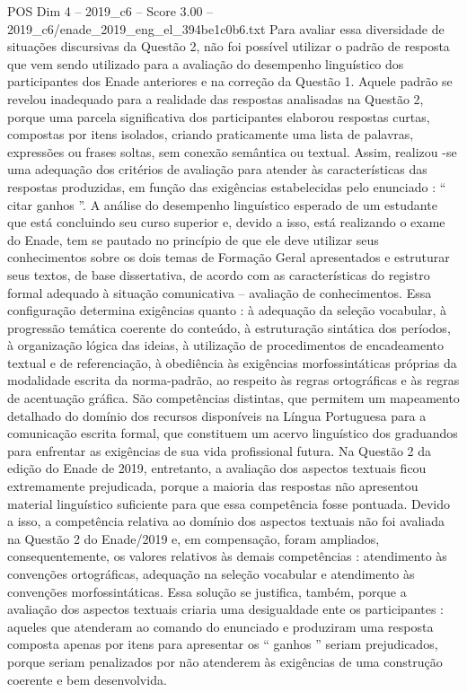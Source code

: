 \begin{textsample}{POS Dim 4 – 2019\_c6 – Score 3.00 – 2019\_c6/enade\_2019\_eng\_el\_394be1c0b6.txt}
Para avaliar essa diversidade de situações discursivas da Questão 2, não foi possível utilizar o padrão de resposta que vem sendo utilizado para a avaliação do desempenho linguístico dos participantes dos Enade anteriores e na correção da Questão 1.
Aquele padrão se revelou inadequado para a realidade das respostas analisadas na Questão 2, porque uma parcela significativa dos participantes elaborou respostas curtas, compostas por itens isolados, criando praticamente uma lista de palavras, expressões ou frases soltas, sem conexão semântica ou textual.
Assim, realizou -se uma adequação dos critérios de avaliação para atender às características das respostas produzidas, em função das exigências estabelecidas pelo enunciado : “ citar ganhos ”.
A análise do desempenho linguístico esperado de um estudante que está concluindo seu curso superior e, devido a isso, está realizando o exame do Enade, tem se pautado no princípio de que ele deve utilizar seus conhecimentos sobre os dois temas de Formação Geral apresentados e estruturar seus textos, de base dissertativa, de acordo com as características do registro formal adequado à situação comunicativa – avaliação de conhecimentos.
Essa configuração determina exigências quanto : à adequação da seleção vocabular, à progressão temática coerente do conteúdo, à estruturação sintática dos períodos, à organização lógica das ideias, à utilização de procedimentos de encadeamento textual e de referenciação, à obediência às exigências morfossintáticas próprias da modalidade escrita da norma-padrão, ao respeito às regras ortográficas e às regras de acentuação gráfica.
São competências distintas, que permitem um mapeamento detalhado do domínio dos recursos disponíveis na Língua Portuguesa para a comunicação escrita formal, que constituem um acervo linguístico dos graduandos para enfrentar as exigências de sua vida profissional futura.
Na Questão 2 da edição do Enade de 2019, entretanto, a avaliação dos aspectos textuais ficou extremamente prejudicada, porque a maioria das respostas não apresentou material linguístico suficiente para que essa competência fosse pontuada.
Devido a isso, a competência relativa ao domínio dos aspectos textuais não foi avaliada na Questão 2 do Enade/2019 e, em compensação, foram ampliados, consequentemente, os valores relativos às demais competências : atendimento às convenções ortográficas, adequação na seleção vocabular e atendimento às convenções morfossintáticas.
Essa solução se justifica, também, porque a avaliação dos aspectos textuais criaria uma desigualdade ente os participantes : aqueles que atenderam ao comando do enunciado e produziram uma resposta composta apenas por itens para apresentar os “ ganhos ” seriam prejudicados, porque seriam penalizados por não atenderem às exigências de uma construção coerente e bem desenvolvida.

\end{textsample}
